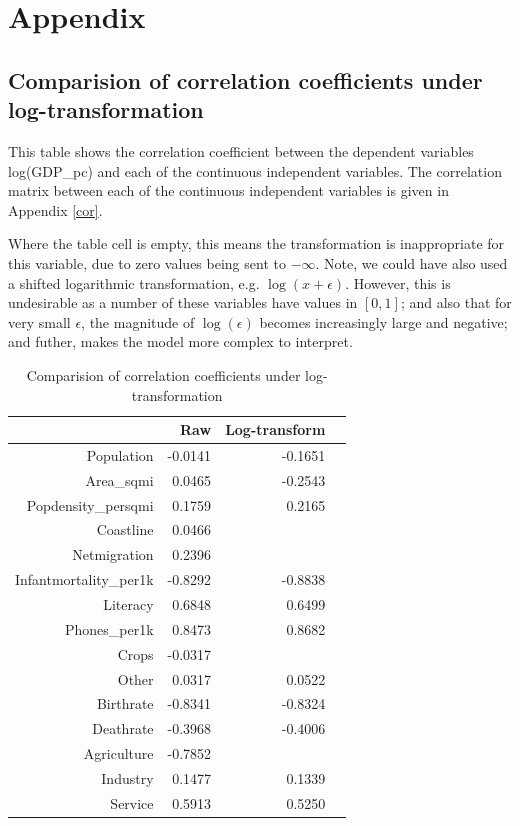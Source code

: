 \documentclass[12pt,a4paper]{article}
\renewcommand\texttt[1]{{\ttfamily\color{ttcolor}#1}}
\begin{document}
\pagebreak
\appendix
\section{Appendix}

\subsection{Comparision of correlation coefficients under log-transformation}
This table shows the correlation coefficient between the dependent variables \texttt{log(GDP\_pc)} and each of the continuous independent variables. The correlation matrix between each of the continuous independent variables is given in Appendix \ref{cor}. 

Where the table cell is empty, this means the transformation is inappropriate for this variable, due to zero values being sent to $-\infty$. Note, we could have also used a shifted logarithmic transformation, e.g. $\log(x+\epsilon)$. However, this is undesirable as a number of these variables have values in $[0,1]$; and also that for very small $\epsilon$, the magnitude of $\log(\epsilon)$ becomes increasingly large and negative; and futher, makes the model more complex to interpret.

\hfill

\begin{table}[ht]
\centering
\begin{tabular}{>{\ttfamily}r r r r }
  \hline
 & Raw & Log-transform \\ 
  \hline
Population & -0.0141 & -0.1651 \\ 
  Area\_sqmi & 0.0465 & -0.2543 \\ 
  Popdensity\_persqmi & 0.1759 & 0.2165 \\ 
  Coastline & 0.0466 &  \\ 
  Netmigration & 0.2396 &  \\ 
  Infantmortality\_per1k & -0.8292 & -0.8838 \\ 
  Literacy & 0.6848 & 0.6499 \\ 
  Phones\_per1k & 0.8473 & 0.8682 \\ 
  Crops & -0.0317 &  \\ 
  Other & 0.0317 & 0.0522 \\ 
  Birthrate & -0.8341 & -0.8324 \\ 
  Deathrate & -0.3968 & -0.4006 \\ 
  Agriculture & -0.7852 &  \\ 
  Industry & 0.1477 & 0.1339 \\ 
  Service & 0.5913 & 0.5250 \\ 
   \hline
\end{tabular}
\caption{Comparision of correlation coefficients under log-transformation}
\label{tablecor}
\end{table}
\end{document}

